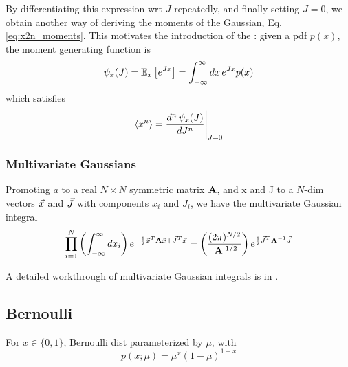 \documentclass[11pt]{article}
\begin{document}
By differentiating this expression wrt $J$ repeatedly, and finally setting $J=0$, we
obtain another way of deriving the moments of the Gaussian,
Eq. \eqref{eq:x2n_moments}. This motivates the introduction of the : given a pdf $p(x)$, the moment generating function is
\begin{equation}
  \psi_x(J) = \mathbb{E}_x \left[ e^{J x} \right] = \int_{-\infty}^{\infty} dx\, e^{J x} p(x)
\end{equation}
which satisfies
\begin{equation}
  \langle x^n \rangle = \frac{d^n\, \psi_x(J)}{d J^n}\Bigg|_{J=0}
\end{equation}





\subsubsection{Multivariate Gaussians}
Promoting $a$ to a real $N \times N$ symmetric matrix $\mathbf{A}$, and x and J to a $N$-dim
vectors $\vec{x}$ and $\vec{J}$ with components $x_i$ and $J_i$, we have the multivariate
Gaussian integral 
\begin{equation}
  \prod_{i=1}^N \left( \int_{-\infty}^{\infty} dx_i \right)
  e^{-\frac{1}{2} \vec{x}^T \mathbf{A} \vec{x} + \vec{J}^T \vec{x}} =
  \left( \frac{(2 \pi)^{N/2}}{|\mathbf{A}|^{1/2}} \right) e^{\frac{1}{2} \vec{J}^T \mathbf{A}^{-1} \vec{J}}
\end{equation}
\TODOFIN{}

A detailed workthrough of multivariate Gaussian integrals is in
\href{http://vixra.org/abs/1404.0026}{}.

\subsection{Bernoulli}
For $x \in \{0, 1\}$, Bernoulli dist parameterized by $\mu$, with
\begin{equation}
  p(x; \mu) = \mu^x (1-\mu)^{1-x}
\end{equation}
\end{document}
